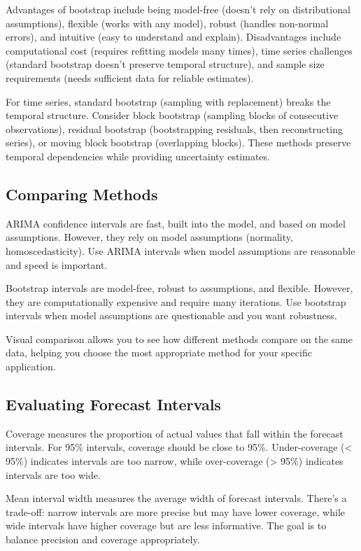 Advantages of bootstrap include being model-free (doesn't rely on distributional assumptions), flexible (works with any model), robust (handles non-normal errors), and intuitive (easy to understand and explain). Disadvantages include computational cost (requires refitting models many times), time series challenges (standard bootstrap doesn't preserve temporal structure), and sample size requirements (needs sufficient data for reliable estimates).

For time series, standard bootstrap (sampling with replacement) breaks the temporal structure. Consider block bootstrap (sampling blocks of consecutive observations), residual bootstrap (bootstrapping residuals, then reconstructing series), or moving block bootstrap (overlapping blocks). These methods preserve temporal dependencies while providing uncertainty estimates.

\subsection{Comparing Methods}

ARIMA confidence intervals are fast, built into the model, and based on model assumptions. However, they rely on model assumptions (normality, homoscedasticity). Use ARIMA intervals when model assumptions are reasonable and speed is important.

Bootstrap intervals are model-free, robust to assumptions, and flexible. However, they are computationally expensive and require many iterations. Use bootstrap intervals when model assumptions are questionable and you want robustness.

Visual comparison allows you to see how different methods compare on the same data, helping you choose the most appropriate method for your specific application.

\subsection{Evaluating Forecast Intervals}

Coverage measures the proportion of actual values that fall within the forecast intervals. For 95\% intervals, coverage should be close to 95\%. Under-coverage (< 95\%) indicates intervals are too narrow, while over-coverage (> 95\%) indicates intervals are too wide.

Mean interval width measures the average width of forecast intervals. There's a trade-off: narrow intervals are more precise but may have lower coverage, while wide intervals have higher coverage but are less informative. The goal is to balance precision and coverage appropriately.

